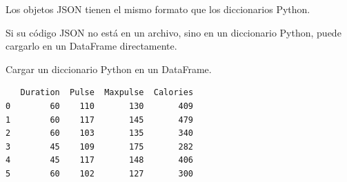Los objetos JSON tienen el mismo formato que los diccionarios Python.

Si su código JSON no está en un archivo, sino en un diccionario Python,
puede cargarlo en un DataFrame directamente. \\

\begin{code} Cargar un diccionario Python en un DataFrame.

\begin{Shaded}
\begin{Highlighting}[]

\OperatorTok{=}\NormalTok{ \{}
  \NormalTok{:\{}
    \NormalTok{:}\NormalTok{,}
    \NormalTok{:}\NormalTok{,}
    \NormalTok{:}\NormalTok{,}
    \NormalTok{:}\NormalTok{,}
    \NormalTok{:}\NormalTok{,}
    \NormalTok{:}
\NormalTok{  \},}
  \NormalTok{:\{}
    \NormalTok{:}\NormalTok{,}
    \NormalTok{:}\NormalTok{,}
    \NormalTok{:}\NormalTok{,}
    \NormalTok{:}\NormalTok{,}
    \NormalTok{:}\NormalTok{,}
    \NormalTok{:}
\NormalTok{  \},}
  \NormalTok{:\{}
    \NormalTok{:}\NormalTok{,}
    \NormalTok{:}\NormalTok{,}
    \NormalTok{:}\NormalTok{,}
    \NormalTok{:}\NormalTok{,}
    \NormalTok{:}\NormalTok{,}
    \NormalTok{:}
\NormalTok{  \},}
  \NormalTok{:\{}
    \NormalTok{:}\NormalTok{,}
    \NormalTok{:}\NormalTok{,}
    \NormalTok{:}\NormalTok{,}
    \NormalTok{:}\NormalTok{,}
    \NormalTok{:}\NormalTok{,}
    \NormalTok{:}
\NormalTok{  \}}
\NormalTok{\}}

\OperatorTok{=}

\end{Highlighting}
\end{Shaded}

\begin{verbatim}
   Duration  Pulse  Maxpulse  Calories
0        60    110       130       409
1        60    117       145       479
2        60    103       135       340
3        45    109       175       282
4        45    117       148       406
5        60    102       127       300
\end{verbatim}
\end{code} 

